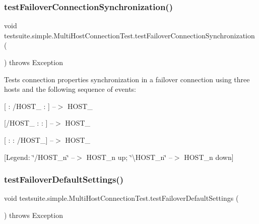 \subsubsection{\texorpdfstring{test\+Failover\+Connection\+Synchronization()}{testFailoverConnectionSynchronization()}}
{\footnotesize\ttfamily void testsuite.\+simple.\+Multi\+Host\+Connection\+Test.\+test\+Failover\+Connection\+Synchronization (\begin{DoxyParamCaption}{ }\end{DoxyParamCaption}) throws Exception}

Tests connection properties synchronization in a failover connection using three hosts and the following sequence of events\+:
\begin{DoxyItemize}
\item \mbox{[} \+: /\+H\+O\+S\+T\+\_ \+: \mbox{]} --$>$ H\+O\+S\+T\+\_
\item \mbox{[}/\+H\+O\+S\+T\+\_ \+:  \+: \mbox{]} --$>$ H\+O\+S\+T\+\_
\item \mbox{[} \+:  \+: /\+H\+O\+S\+T\+\_\mbox{]} --$>$ H\+O\+S\+T\+\_
\end{DoxyItemize}

\mbox{[}Legend\+: \char`\"{}/\+H\+O\+S\+T\+\_\+n\char`\"{} --$>$ H\+O\+S\+T\+\_\+n up; \char`\"{}\textbackslash{}\+H\+O\+S\+T\+\_\+n\char`\"{} --$>$ H\+O\+S\+T\+\_\+n down\mbox{]} \mbox{\label{classtestsuite_1_1simple_1_1_multi_host_connection_test_ab41d61126e424b0903c7a6411d40a213}} 
\subsubsection{\texorpdfstring{test\+Failover\+Default\+Settings()}{testFailoverDefaultSettings()}}
{\footnotesize\ttfamily void testsuite.\+simple.\+Multi\+Host\+Connection\+Test.\+test\+Failover\+Default\+Settings (\begin{DoxyParamCaption}{ }\end{DoxyParamCaption}) throws Exception}

